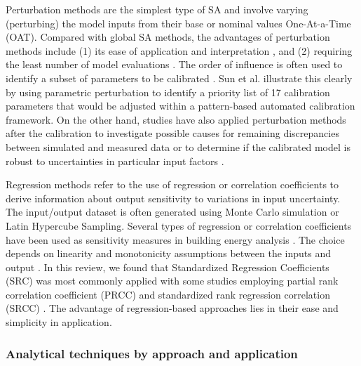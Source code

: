 \documentclass[review]{elsarticle}
\begin{document}
Perturbation methods are the simplest type of SA and involve varying (perturbing) the model inputs from their base or nominal values One-At-a-Time (OAT). Compared with global SA methods, the advantages of perturbation methods include (1) its ease of application and interpretation \cite{tian2013review}, and (2) requiring the least number of model evaluations \cite{pianosi2016sensitivity}. The order of influence is often used to identify a subset of parameters to be calibrated \cite{robertson2015reduced, sun2016pattern, enriquez2017towards, tuysuz2020calibrating, kim2015development, kim2016development, elharidi2017energy, glasgo2017assessing}. Sun et al. \cite{sun2016pattern} illustrate this clearly by using parametric perturbation to identify a priority list of 17 calibration parameters that would be adjusted within a pattern-based automated calibration framework. On the other hand, studies have also applied perturbation methods after the calibration to investigate possible causes for remaining discrepancies between simulated and measured data \cite{allard2018energy} or to determine if the calibrated model is robust to uncertainties in particular input factors \cite{mihai2017bottom}. 

Regression methods refer to the use of regression or correlation coefficients to derive information about output sensitivity to variations in input uncertainty. The input/output dataset is often generated using Monte Carlo simulation or Latin Hypercube Sampling. Several types of regression or correlation coefficients have been used as sensitivity measures in building energy analysis  \cite{tian2013review}. The choice depends on linearity and monotonicity assumptions between the inputs and output \cite{pianosi2016sensitivity}. In this review, we found that Standardized Regression Coefficients (SRC) was most commonly applied \cite{lim2018influences, qiu2018quick, lim2017comprehensive, tian2016identifying} with some studies employing partial rank correlation coefficient (PRCC) \cite{andrade-cabrera2019augmented} and standardized rank regression correlation (SRCC) \cite{ascione2020real}. The advantage of regression-based approaches lies in their ease and simplicity in application. 

\subsubsection{Analytical techniques by approach and application}
\end{document}
